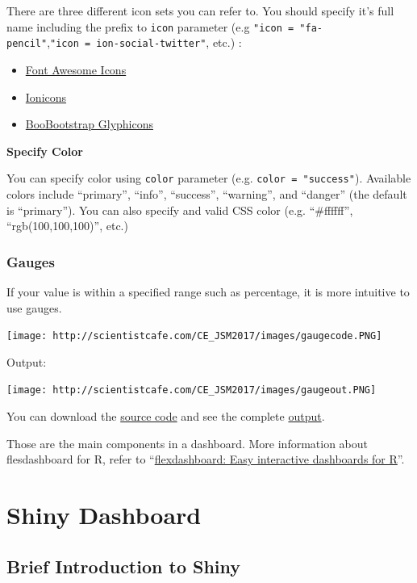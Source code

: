 \documentclass[]{book}
\providecommand{\tightlist}{%
  \setlength{\itemsep}{0pt}\setlength{\parskip}{0pt}}
\theoremstyle{definition}
\theoremstyle{definition}
\theoremstyle{remark}
\begin{document}
There are three different icon sets you can refer to. You should specify
it's full name including the prefix to \texttt{icon} parameter (e.g
\texttt{"icon\ =\ "fa-pencil"},\texttt{"icon\ =\ ion-social-twitter"},
etc.) :

\begin{itemize}
\tightlist
\item
  \href{http://fontawesome.io/icons/}{Font Awesome Icons}
\item
  \href{http://ionicons.com/}{Ionicons}
\item
  \href{https://getbootstrap.com/components/\#glyphicons}{BooBootstrap
  Glyphicons}
\end{itemize}

\textbf{Specify Color}

You can specify color using \texttt{color} parameter (e.g.
\texttt{color\ =\ "success"}). Available colors include ``primary'',
``info'', ``success'', ``warning'', and ``danger'' (the default is
``primary''). You can also specify and valid CSS color (e.g.
``\#ffffff'', ``rgb(100,100,100)'', etc.)

\subsubsection{Gauges}\label{gauges}

If your value is within a specified range such as percentage, it is more
intuitive to use gauges.

\texttt{[image: http://scientistcafe.com/CE\_JSM2017/images/gaugecode.PNG]}

Output:

\texttt{[image: http://scientistcafe.com/CE\_JSM2017/images/gaugeout.PNG]}

You can download the
\href{http://scientistcafe.com/CE_JSM2017/Examples/gauge.Rmd}{source
code} and see the complete
\href{http://scientistcafe.com/CE_JSM2017/Examples/gauge.html}{output}.

Those are the main components in a dashboard. More information about
flesdashboard for R, refer to
``\href{http://rmarkdown.rstudio.com/flexdashboard/index.html}{flexdashboard:
Easy interactive dashboards for R}''.

\section{Shiny Dashboard}\label{shiny-dashboard}

\subsection{Brief Introduction to
Shiny}\label{brief-introduction-to-shiny}
\end{document}
